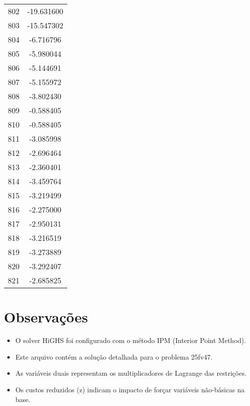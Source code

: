 \documentclass[12pt]{article}
\begin{document}
\begin{longtable}{@{}cc@{}}
802 & -19.631600 \\
803 & -15.547302 \\
804 & -6.716796 \\
805 & -5.980044 \\
806 & -5.144691 \\
807 & -5.155972 \\
808 & -3.802430 \\
809 & -0.588405 \\
810 & -0.588405 \\
811 & -3.085998 \\
812 & -2.696464 \\
813 & -2.360401 \\
814 & -3.459764 \\
815 & -3.219499 \\
816 & -2.275000 \\
817 & -2.950131 \\
818 & -3.216519 \\
819 & -3.273889 \\
820 & -3.292407 \\
821 & -2.685825 \\

\end{longtable}


\section{Observações}

\begin{itemize}
\item O solver HiGHS foi configurado com o método IPM (Interior Point Method).
\item Este arquivo contém a solução detalhada para o problema 25fv47.
\item As variáveis duais representam os multiplicadores de Lagrange das restrições.
\item Os custos reduzidos (z) indicam o impacto de forçar variáveis não-básicas na base.
\end{itemize}
\end{document}

